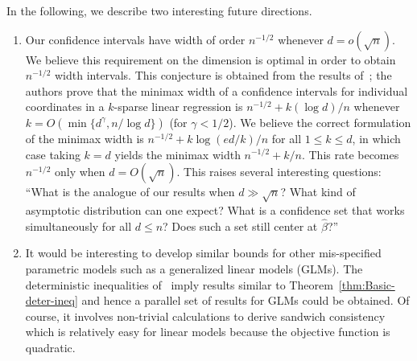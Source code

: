 \documentclass[11pt]{article}
\begin{document}
In the following, we describe two interesting future directions.
\begin{enumerate}
\item Our confidence intervals have width of order $n^{-1/2}$ whenever $d = o(\sqrt{n})$. We believe this requirement on the dimension is optimal in order to obtain $n^{-1/2}$ width intervals. This conjecture is obtained from the results of~\cite{cai2017confidence}; the authors prove that the minimax width of a confidence intervals for individual coordinates in a $k$-sparse linear regression is $n^{-1/2} + k(\log d)/n$ whenever $k = O(\min\{d^{\gamma}, n/\log d\})$ (for $\gamma < 1/2$). We believe the correct formulation of the minimax width is $n^{-1/2} + k\log(ed/k)/n$ for all $1\le k\le d$, in which case taking $k = d$ yields the minimax width $n^{-1/2} + k/n$. This rate becomes $n^{-1/2}$ only when $d = O(\sqrt{n})$. This raises several interesting questions: ``What is the analogue of our results when $d \gg \sqrt{n}$? What kind of asymptotic distribution can one expect? What is a confidence set that works simultaneously for all $d \le n$? Does such a set still center at $\widehat{\beta}$?'' 
\item It would be interesting to develop similar bounds for
other mis-specified parametric models such as a generalized linear
models (GLMs). The deterministic inequalities of~\cite{2018arXiv180905172K}
imply results similar to Theorem~\ref{thm:Basic-deter-ineq} and hence
a parallel set of results for GLMs could be obtained. Of course, it involves non-trivial calculations to derive sandwich consistency which is
relatively easy for linear models because the objective function is quadratic.  
\end{enumerate}

\newpage
\end{document}
